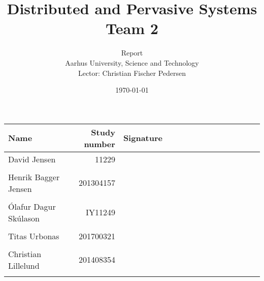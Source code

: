 \documentclass[a4paper,10pt,twoside,openright]{memoir}
\title{Distributed and Pervasive Systems \\ Team 2}
\author{Report \\ Aarhus University, Science and Technology \\ Lector: Christian Fischer Pedersen}
\date{\today}
\begin{document}
\fancyhf{} %
\frontmatter
\maketitle
\vfill


\begin{table} [h]
	\centering
	\begin{tabular}{|l|r|l|}
	\hline 
	\textbf{Name} 				& \textbf{Study number} & \textbf{Signature~~~~~~~~~~~~~~~~~~~~} 	\\ \hline
	David Jensen 				& 11229 	& \\ && 												\\ \hline
	Henrik Bagger Jensen 		& 201304157 & \\ && 												\\ \hline
	Ólafur Dagur Skúlason 		& IY11249	& \\ && 												\\ \hline
	Titas Urbonas 				& 201700321 & \\ && 												\\ \hline
	Christian Lillelund 		& 201408354 & \\ && 												\\ \hline

	\end{tabular}
\end{table}

\clearpage
\pagestyle{plain}

\tableofcontents

\vfill

\mainmatter
\pagestyle{fancy}
\fancyhf{} %
\fancyhead[CE,CO]{\nouppercase{\leftmark}}
\fancyfoot[CO,CE]{\nouppercase{\rightmark}}
\fancyfoot[LE,RO]{\thepage}

				\cleartorightpage
	\cleartorightpage
		\cleartorightpage
		\cleartorightpage
					\cleartorightpage
				\cleartorightpage
			\cleartorightpage
			\cleartorightpage
				\cleartorightpage
				    \cleartorightpage
				    \cleartorightpage
				\cleartorightpage
				\cleartorightpage

\end{document}
